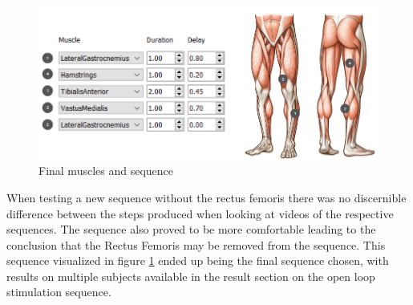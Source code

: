 \begin{figure} [h]
    \centering
    \includegraphics[width=0.99\linewidth]{images/final_seq_w_muscles.png}
    \caption{Final muscles and sequence}
    \label{fig:fianlsequence}
\end{figure}

When testing a new sequence without the rectus femoris there was no discernible difference between the steps produced when looking at videos of the respective sequences. The sequence also proved to be more comfortable leading to the conclusion that the Rectus Femoris may be removed from the sequence. This sequence visualized in figure \ref{fig:fianlsequence} ended up being the final sequence chosen, with results on multiple subjects available in the result section on the open loop stimulation sequence.



